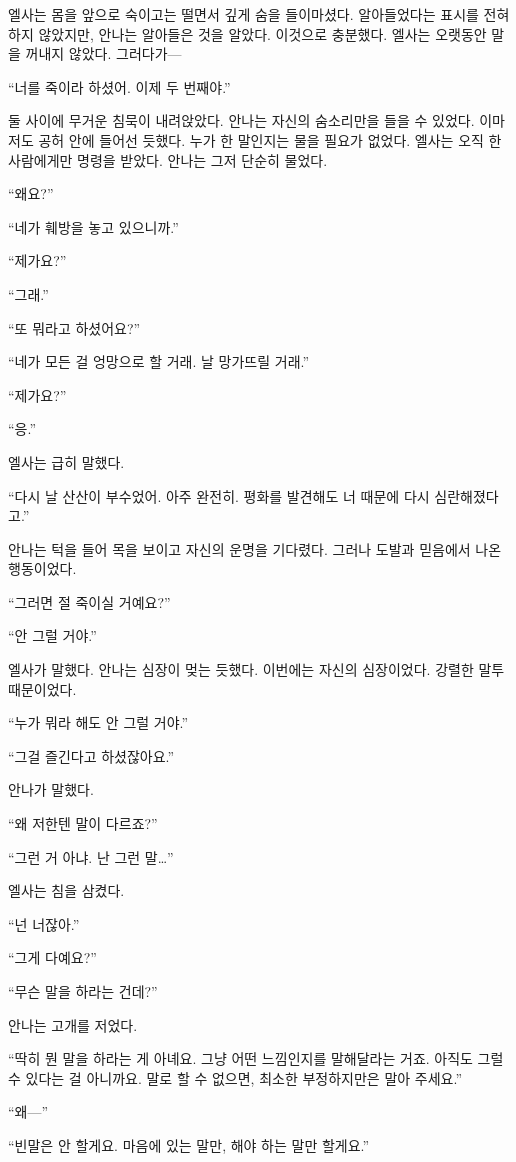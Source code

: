 엘사는 몸을 앞으로 숙이고는 떨면서 깊게 숨을 들이마셨다. 알아들었다는 표시를 전혀 하지 않았지만, 안나는 알아들은 것을 알았다. 이것으로 충분했다. 엘사는 오랫동안 말을 꺼내지 않았다. 그러다가—

``너를 죽이라 하셨어. 이제 두 번째야.''

둘 사이에 무거운 침묵이 내려앉았다. 안나는 자신의 숨소리만을 들을 수 있었다. 이마저도 공허 안에 들어선 듯했다. 누가 한 말인지는 물을 필요가 없었다. 엘사는 오직 한 사람에게만 명령을 받았다. 안나는 그저 단순히 물었다.

``왜요?''

``네가 훼방을 놓고 있으니까.''

``제가요?''

``그래.''

``또 뭐라고 하셨어요?''

``네가 모든 걸 엉망으로 할 거래. 날 망가뜨릴 거래.''

``제가요?''

``응.''

엘사는 급히 말했다.

``다시 날 산산이 부수었어. 아주 완전히. 평화를 발견해도 너 때문에 다시 심란해졌다고.''

안나는 턱을 들어 목을 보이고 자신의 운명을 기다렸다. 그러나 도발과 믿음에서 나온 행동이었다.

``그러면 절 죽이실 거예요?''

``안 그럴 거야.''

엘사가 말했다. 안나는 심장이 멎는 듯했다. 이번에는 자신의 심장이었다. 강렬한 말투 때문이었다.

``누가 뭐라 해도 안 그럴 거야.''

``그걸 즐긴다고 하셨잖아요.''

안나가 말했다.

``왜 저한텐 말이 다르죠?''

``그런 거 아냐. 난 그런 말\ldots''

엘사는 침을 삼켰다.

``넌 너잖아.''

``그게 다예요?''

``무슨 말을 하라는 건데?''

안나는 고개를 저었다.

``딱히 뭔 말을 하라는 게 아녜요. 그냥 어떤 느낌인지를 말해달라는 거죠. 아직도 그럴 수 있다는 걸 아니까요. 말로 할 수 없으면, 최소한 부정하지만은 말아 주세요.''

``왜—''

``빈말은 안 할게요. 마음에 있는 말만, 해야 하는 말만 할게요.''

